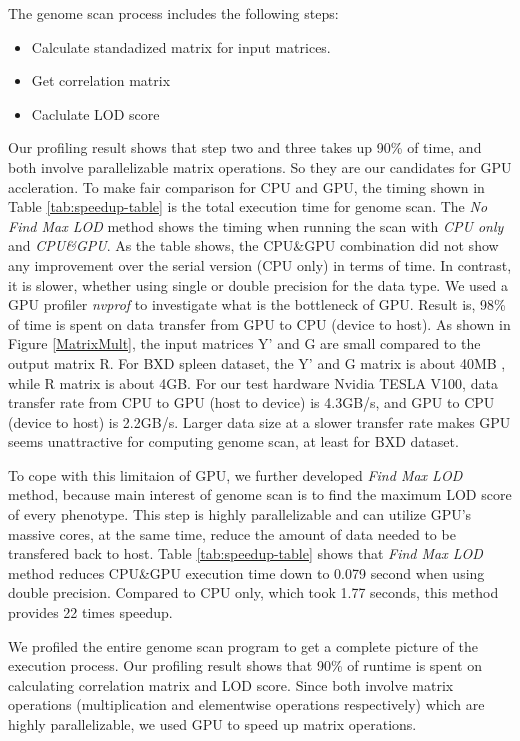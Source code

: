 \documentclass[9pt,twocolumn,twoside,lineno]{gsag3jnl}
\begin{document}
The genome scan process includes the following steps:
\begin{itemize}
	\item Calculate standadized matrix for input matrices.
	\item Get correlation matrix
	\item Caclulate LOD score
\end{itemize}
Our profiling result shows that step two and three takes up 90\% of time, and both involve parallelizable matrix operations. 
So they are our candidates for GPU accleration.
To make fair comparison for CPU and GPU, the timing shown in Table \ref{tab:speedup-table} is the total execution time for genome scan. 
The \textit{No Find Max LOD} method shows the timing when running the scan with \textit{CPU only} and \textit{CPU\&GPU}.
As the table shows, the CPU\&GPU combination did not show any improvement over the serial version (CPU only) in terms of time. 
In contrast, it is slower, whether using single or double precision for the data type.
We used a GPU profiler \textit{nvprof} %
to investigate what is the bottleneck of GPU. 
Result is, 98\% of time is spent on data transfer from GPU to CPU (device to host).
As shown in Figure \ref{MatrixMult}, the input matrices Y' and G are small compared to the output matrix R.
For BXD spleen dataset, the Y' and G matrix is about 40MB %
, while R matrix is about 4GB.
For our test hardware Nvidia TESLA V100, data transfer rate from CPU to GPU (host to device) is 4.3GB/s, and GPU to CPU (device to host) is 2.2GB/s. %
Larger data size at a slower transfer rate makes GPU seems unattractive for computing genome scan, at least for BXD dataset.

To cope with this limitaion of GPU, we further developed \textit{Find Max LOD} method, because main interest of genome scan is to find the maximum LOD score of every phenotype. 
This step is highly parallelizable and can utilize GPU's massive cores, at the same time, reduce the amount of data needed to be transfered back to host. 
Table \ref{tab:speedup-table} shows that \textit{Find Max LOD} method reduces CPU\&GPU execution time down to 0.079 second when using double precision. 
Compared to CPU only, which took 1.77 seconds, this method provides 22 times speedup. 





\iffalse
We profiled the entire genome scan program to get a complete picture of the execution process.
Our profiling result shows that 90\% of runtime is spent on calculating correlation matrix and LOD score. 
Since both involve matrix operations (multiplication and elementwise operations respectively) which are highly parallelizable, we used GPU to speed up matrix operations. 
\end{document}
